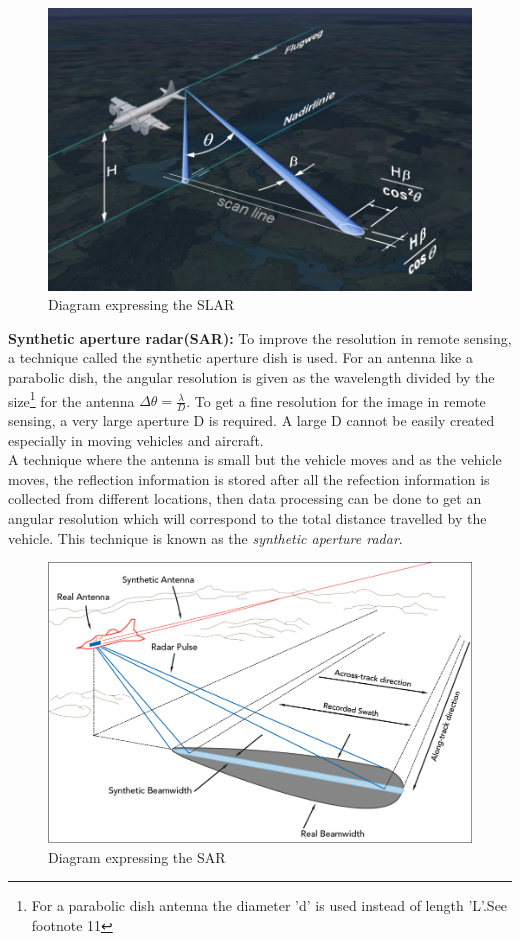 \begin{figure}[h]
\centering
\includegraphics[scale=0.2]{./graphics/SLAR-resolution}
\caption{Diagram expressing the SLAR}
\end{figure}
\textbf{Synthetic aperture radar(SAR):} To improve the resolution in remote sensing, a technique called the synthetic aperture dish is used. For an antenna like a parabolic dish, the angular resolution is given as the wavelength divided by the size\footnote{For a parabolic dish antenna the diameter 'd' is used instead of length 'L'.See footnote 11} for the antenna $\Delta \theta = \frac{\lambda}{D}$. To get a fine resolution for the image in remote sensing, a very large aperture D is required. A large D cannot be easily created especially in moving vehicles and aircraft.\\

A technique where the antenna is small but the vehicle moves and as the vehicle moves, the reflection information is stored after all the refection information is collected from different locations, then data processing can be done to get an angular resolution which will correspond to the total distance travelled by the vehicle. This technique is known as the \textit{synthetic aperture radar}.
\begin{figure}[h]
\centering
\includegraphics[scale=0.3]{./graphics/sar2}
\caption{Diagram expressing the SAR}
\end{figure}

